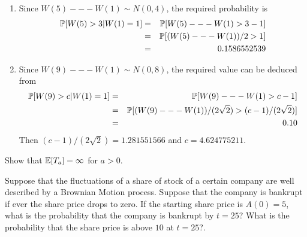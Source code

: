 \begin{solution}
\begin{solution}
\begin{solution}
\begin{solution}
\begin{solution}
\begin{solution}
\begin{solution}
\begin{solution}
\begin{solution}
\begin{solution}
{\begin{problem}
\end{problem} 
\begin{solution} 

\begin{enumerate}
    \item
        Since $ W(5) --- W(1) \sim N(0,4) $, the required
        probability is
        \begin{eqnarray*}
            \P[ W(5) > 3 | W(1) = 1] &=& \P[ W(5) --- W(1) > 3 -
            1] \\
            &=& \P[ ( W(5) --- W(1))/2 > 1] \\
            &=& 0.1586552539
        \end{eqnarray*}
    \item
        Since $ W(9) --- W(1) \sim N(0,8) $, the required value
        can be deduced from
        \begin{eqnarray*}
            \P[ W(9) > c | W(1) = 1] &=& \P[ W(9) --- W(1) > c -
            1] \\
            &=& \P[ ( W(9) --- W(1))/(2\sqrt{2}) > (c -1)/(2\sqrt
            {2}) ] \\
            &=& 0.10
        \end{eqnarray*}
        Then $ (c -1)/(2 \sqrt{2}) = 1.281551566 $ and $ c=
        4.624775211 $.
\end{enumerate}
\end{solution}

\begin{problem}
  Show that \( \E[T_a] = \infty \) for $ a > 0 $.
\end{problem} 
\begin{solution} 

\end{solution}

\begin{problem}
  Suppose that the fluctuations of a share of stock of a certain
  company are well described by a Brownian Motion process. Suppose
  that the company is bankrupt if ever the share price drops to
  zero.  If the starting share price is $ A(0) = 5 $, what is the
  probability that the company is bankrupt by $ t = 25 $?  What is
  the probability that the share price is above $ 10 $ at $ t = 25$?.
  
\end{problem} 
\begin{solution} 


\end{solution}}
\end{solution}
\end{solution}
\end{solution}
\end{solution}
\end{solution}
\end{solution}
\end{solution}
\end{solution}
\end{solution}
\end{solution}
